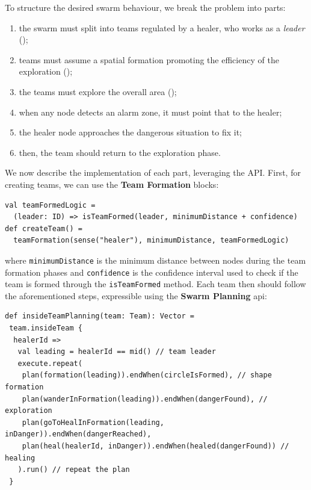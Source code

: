 To structure the desired swarm behaviour, 
 we break the problem into parts:
\begin{enumerate}
  \item the swarm must split into teams regulated by a healer, who works as a \emph{leader} %
   ();
  \item teams must assume a spatial formation promoting the efficiency of the exploration ();
  \item the teams must explore the overall area ();
  \item when any node detects an alarm zone, it must point that to the healer;
  \item the healer node approaches the dangerous situation to fix it;
  \item then, the team should return to the exploration phase.
\end{enumerate}
%
We now describe the implementation of each part, leveraging the \MacroSwarm{} API. %
First, for creating teams, we can use the \textbf{Team Formation} blocks:
\begin{lstlisting}
val teamFormedLogic = 
  (leader: ID) => isTeamFormed(leader, minimumDistance + confidence)
def createTeam() = 
  teamFormation(sense("healer"), minimumDistance, teamFormedLogic)
\end{lstlisting}
where \lstinline|minimumDistance| is the minimum distance between nodes during the 
 team formation phases and \lstinline|confidence| is the confidence interval 
 used to check if the team is formed through the \lstinline|isTeamFormed| method.
%
Each team then should follow the aforementioned steps, 
 expressible using the \textbf{Swarm Planning} \ac{api}: 
%
\begin{lstlisting}[xrightmargin=-2pt]
def insideTeamPlanning(team: Team): Vector = 
 team.insideTeam {
  healerId =>
   val leading = healerId == mid() // team leader
   execute.repeat(
    plan(formation(leading)).endWhen(circleIsFormed), // shape formation
    plan(wanderInFormation(leading)).endWhen(dangerFound), // exploration
    plan(goToHealInFormation(leading, inDanger)).endWhen(dangerReached), 
    plan(heal(healerId, inDanger)).endWhen(healed(dangerFound)) // healing
   ).run() // repeat the plan
 }
\end{lstlisting}
